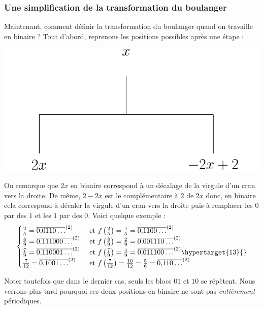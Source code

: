 \documentclass[a4paper,french,12pt]{article}
\begin{document}
\subsubsection{Une simplification de la transformation du boulanger}
Maintenant, comment définir la transformation du boulanger quand on travaille en binaire ? Tout d'abord, reprenons les positions possibles après une étape :
\begin{center}
\includegraphics[scale=0.45]{../TeXGraph/Pdf/visuel_2D_arbre.pdf}
\end{center}
On remarque que $2x$ en binaire correspond à un décalage de la virgule d'un cran vers la droite. De même, $2-2x$ est le complémentaire à $2$ de $2x$ donc, en binaire cela correspond à décaler la virgule d'un cran vers la droite puis à remplacer les $0$ par des $1$ et les $1$ par des $0$. Voici quelque exemple :
\hypertarget{9}{}
\[\begin{cases}\frac{2}{5}=\overline{0{,}0110\ldots}^{\left(2\right)}&\text{ et }f\left(\frac{2}{5}\right)=\frac{4}{5}=\overline{0{,}1100\ldots}^{\left(2\right)}\\\frac{8}{9}=\overline{0{,}111000\ldots}^{\left(2\right)}&\text{ et }f\left(\frac{8}{9}\right)=\frac{2}{9}=\overline{0{,}001110\ldots}^{\left(2\right)}\\\frac{7}{9}=\overline{0{,}110001\ldots}^{\left(2\right)}&\text{ et }f\left(\frac{7}{9}\right)=\frac{4}{9}=\overline{0{,}011100\ldots}^{\left(2\right)}\hypertarget{13}{}\\\frac{7}{12}=\overline{0{,}1001\ldots}^{\left(2\right)}&\text{ et }f\left(\frac{7}{12}\right)=\frac{10}{12}=\frac{5}{6}=\overline{0{,}110\ldots}^{\left(2\right)}\end{cases}\]

Noter toutefois que dans le dernier cas, seuls les blocs $01$ et $10$ se répètent. Nous verrons plus tard pourquoi ces deux positions en binaire ne sont pas \emph{entièrement} périodiques.
\end{document}
